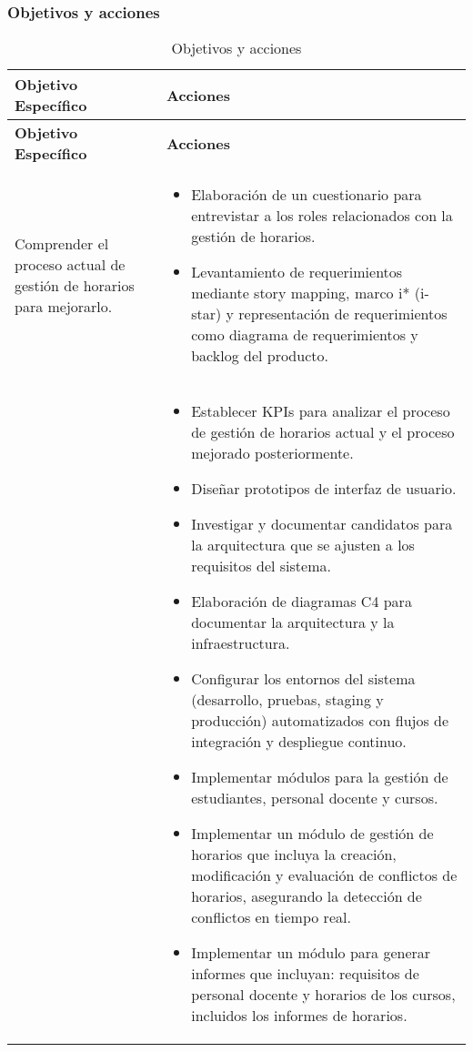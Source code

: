 \subsubsection{Objetivos y acciones}
\begin{longtable}{p{3in}|p{3in}}
\caption{Objetivos y acciones} \label{tab:objectivesNactions} \\
\hline
\textbf{Objetivo Específico} & \textbf{Acciones} \\
\hline
\endfirsthead
\hline
\textbf{Objetivo Específico} & \textbf{Acciones} \\
\hline
\endhead
\hline
\endfoot

Comprender el proceso actual de gestión de horarios para mejorarlo. &
\begin{itemize}
    \item Elaboración de un cuestionario para entrevistar a los roles relacionados con la gestión de horarios.
	\item Levantamiento de requerimientos mediante story mapping, marco i* (i-star) y representación de requerimientos como diagrama de requerimientos y backlog del producto.
\end{itemize}
\\\

&
\begin{itemize}
	\item Establecer KPIs para analizar el proceso de gestión de horarios actual y el proceso mejorado posteriormente.
	\item Diseñar prototipos de interfaz de usuario.
    \item Investigar y documentar candidatos para la arquitectura que se ajusten a los requisitos del sistema.
	\item Elaboración de diagramas C4 para documentar la arquitectura y la infraestructura.
    \item Configurar los entornos del sistema (desarrollo, pruebas, staging y producción) automatizados con flujos de integración y despliegue continuo.
	\item Implementar módulos para la gestión de estudiantes, personal docente y cursos.
	\item Implementar un módulo de gestión de horarios que incluya la creación, modificación y evaluación de conflictos de horarios, asegurando la detección de conflictos en tiempo real.
	\item Implementar un módulo para generar informes que incluyan: requisitos de personal docente y horarios de los cursos, incluidos los informes de horarios.
\end{itemize}
\\\hline


\end{longtable}
